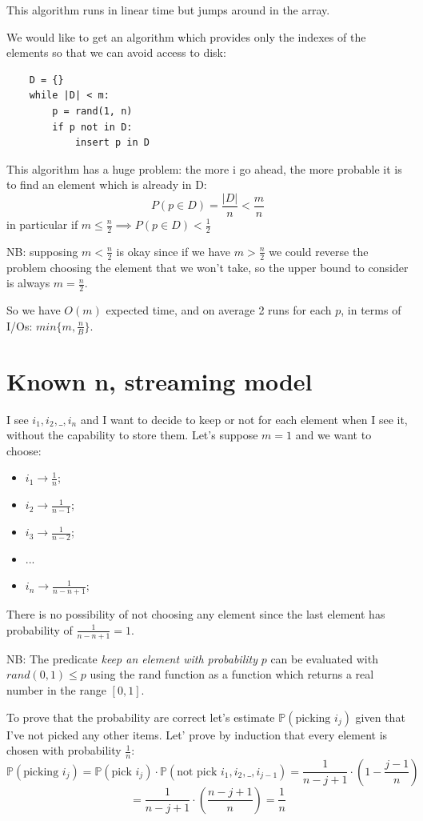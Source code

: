 This algorithm runs in linear time but jumps around in the array.

We would like to get an algorithm which provides only the indexes of the elements so that we can avoid access to disk: 
\begin{verbatim}
    D = {}
    while |D| < m:
        p = rand(1, n)
        if p not in D:
            insert p in D
\end{verbatim}
This algorithm has a huge problem: the more i go ahead, the more probable it is to find an element which is already in D:
$$
    P(p \in D) = \frac{|D|}{n} < \frac{m}{n}
$$
in particular if $m \leq \frac{n}{2} \implies P(p \in D) < \frac{1}{2}$

NB: supposing $m < \frac{n}{2}$ is okay since if we have $m > \frac{n}{2}$ we could reverse the problem choosing the element that we won't take, so the upper bound to consider is always $m = \frac{n}{2}$.

So we have $O(m)$ expected time, and on average 2 runs for each $p$, in terms of I/Os: $min \{ m, \frac{n}{B} \}$.

\section{Known n, streaming model}
I see $i_1, i_2, \_, i_n$ and I want to decide to keep or not for each element when I see it, without the capability to store them.
Let's suppose $m=1$ and we want to choose:
\begin{itemize}
    \item $i_1 \xrightarrow{} \frac{1}{n}$;
    \item $i_2 \xrightarrow{} \frac{1}{n-1}$;
    \item $i_3 \xrightarrow{} \frac{1}{n-2}$;
    \item ...
    \item $i_n \xrightarrow{} \frac{1}{n-n+1}$;
\end{itemize}
There is no possibility of not choosing any element since the last element has probability of $\frac{1}{n-n+1} = 1$.

NB: The predicate \emph{keep an element with probability} $p$ can be evaluated with $rand(0, 1) \leq p$ using the rand function as a function which returns a real number in the range $[0, 1]$.

To prove that the probability are correct let's estimate $\mathbb{P}(\text{picking } i_j)$ given that I've not picked any other items.
Let' prove by induction that every element is chosen with probability $\frac{1}{n}$:
$$
    \mathbb{P}(\text{picking } i_j) = \mathbb{P}(\text{pick } i_j) \cdot \mathbb{P}(\text{not pick }i_1, i_2, \_, i_{j-1}) = \frac{1}{n-j+1}\cdot \left(1 - \frac{j-1}{n} \right)
$$
$$
    = \frac{1}{n-j+1}\cdot \left(\frac{n - j + 1}{n} \right) = \frac{1}{n}
$$


